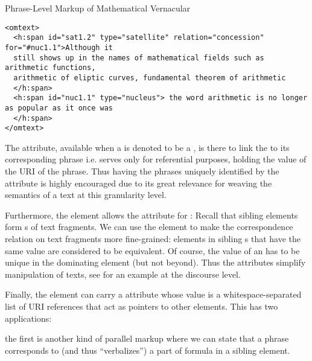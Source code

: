 \begin{module}[id=mtext]
\begin{omgroup}[id=mtext,short=Mathematical Text]
\begin{omgroup}[id=phrases]{Phrase-Level Markup of Mathematical Vernacular}
\begin{lstlisting}[label=lst:phrase-type-attribute, caption= Phrases and their attribute 
usage, index={h:span}]
<omtext>
  <h:span id="sat1.2" type="satellite" relation="concession" for="#nuc1.1">Although it 
  still shows up in the names of mathematical fields such as arithmetic functions, 
  arithmetic of eliptic curves, fundamental theorem of arithmetic
  </h:span>
  <h:span id="nuc1.1" type="nucleus"> the word arithmetic is no longer as popular as it once was
  </h:span>
</omtext>
\end{lstlisting}

  The  attribute, available when a  is denoted to be a 
  , is there to link the  to its 
  corresponding  phrase i.e. serves only for referential 
  purposes, holding the value of the URI of the  phrase. 
  Thus having the phrases uniquely identified by the  
  attribute is highly encouraged due to its great relevance for weaving the semantics of 
  a text at this granularity level.

  Furthermore, the  element allows the attribute
   for {}:
  Recall that sibling  elements form {s} of
  text fragments.  We can use the  element to make the
  correspondence relation on text fragments more fine-grained: 
  elements in sibling s that have the same
   value are considered to be equivalent.  Of course, the
  value of an  has to be unique in the dominating
   element (but not beyond). Thus the 
  attributes simplify manipulation of {} texts, see
  {} for an example at the discourse level.

  Finally, the  element can carry a 
  attribute whose value is a whitespace-separated list of URI references that act as
  pointers to other \omdoc elements. This has two applications: 
  \begin{example}[display=flow] the first is another kind of parallel markup where we can
    state that a phrase corresponds to (and thus ``verbalizes'') a part of formula in a
    sibling  element.


\end{example}
\end{omgroup}
\end{omgroup}
\end{module}
